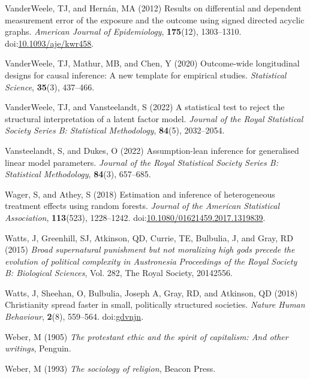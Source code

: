 \documentclass[
  single column]{article}
\newlength{\cslhangindent}
\newenvironment{CSLReferences}[2] %
 {\begin{list}{}{%
  \setlength{\itemindent}{0pt}
  \setlength{\leftmargin}{0pt}
  \setlength{\parsep}{0pt}
  \ifodd #1
   \setlength{\leftmargin}{\cslhangindent}
   \setlength{\itemindent}{-1\cslhangindent}
  \fi
  \setlength{\itemsep}{#2\baselineskip}}}
 {\end{list}}
\begin{document}
\begin{CSLReferences}{1}{0}
VanderWeele, TJ, and Hernán, MA (2012) Results on differential and
dependent measurement error of the exposure and the outcome using signed
directed acyclic graphs. \emph{American Journal of Epidemiology},
\textbf{175}(12), 1303--1310.
doi:\href{https://doi.org/10.1093/aje/kwr458}{10.1093/aje/kwr458}.

VanderWeele, TJ, Mathur, MB, and Chen, Y (2020) Outcome-wide
longitudinal designs for causal inference: A new template for empirical
studies. \emph{Statistical Science}, \textbf{35}(3), 437--466.

VanderWeele, TJ, and Vansteelandt, S (2022) A statistical test to reject
the structural interpretation of a latent factor model. \emph{Journal of
the Royal Statistical Society Series B: Statistical Methodology},
\textbf{84}(5), 2032--2054.

Vansteelandt, S, and Dukes, O (2022) Assumption-lean inference for
generalised linear model parameters. \emph{Journal of the Royal
Statistical Society Series B: Statistical Methodology}, \textbf{84}(3),
657--685.

Wager, S, and Athey, S (2018) Estimation and inference of heterogeneous
treatment effects using random forests. \emph{Journal of the American
Statistical Association}, \textbf{113}(523), 1228--1242.
doi:\href{https://doi.org/10.1080/01621459.2017.1319839}{10.1080/01621459.2017.1319839}.

Watts, J, Greenhill, SJ, Atkinson, QD, Currie, TE, Bulbulia, J, and
Gray, RD (2015) \emph{Broad supernatural punishment but not moralizing
high gods precede the evolution of political complexity in
{A}ustronesia} \emph{Proceedings of the Royal Society B: Biological
Sciences}, Vol. 282, The Royal Society, 20142556.

Watts, J, Sheehan, O, Bulbulia, Joseph A, Gray, RD, and Atkinson, QD
(2018) Christianity spread faster in small, politically structured
societies. \emph{Nature Human Behaviour}, \textbf{2}(8), 559--564.
doi:\href{https://doi.org/gdvnjn}{gdvnjn}.

Weber, M (1905) \emph{The protestant ethic and the spirit of capitalism:
And other writings}, Penguin.

Weber, M (1993) \emph{The sociology of religion}, Beacon Press.


\end{CSLReferences}
\end{document}
